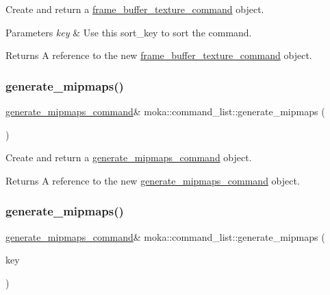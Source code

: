 Create and return a \mbox{\hyperlink{classmoka_1_1frame__buffer__texture__command}{frame\+\_\+buffer\+\_\+texture\+\_\+command}} object. 


\begin{DoxyParams}{Parameters}
{\em key} & Use this sort\+\_\+key to sort the command. \\
\hline
\end{DoxyParams}
\begin{DoxyReturn}{Returns}
A reference to the new \mbox{\hyperlink{classmoka_1_1frame__buffer__texture__command}{frame\+\_\+buffer\+\_\+texture\+\_\+command}} object. 
\end{DoxyReturn}
\mbox{\label{classmoka_1_1command__list_a5248fda12caf3d68ac2803ccfaa3a4f7}} 
\subsubsection{\texorpdfstring{generate\_mipmaps()}{generate\_mipmaps()}\hspace{0.1cm}{\footnotesize\ttfamily [1/2]}}
{\footnotesize\ttfamily \mbox{\hyperlink{classmoka_1_1generate__mipmaps__command}{generate\+\_\+mipmaps\+\_\+command}}\& moka\+::command\+\_\+list\+::generate\+\_\+mipmaps (\begin{DoxyParamCaption}{ }\end{DoxyParamCaption})}



Create and return a \mbox{\hyperlink{classmoka_1_1generate__mipmaps__command}{generate\+\_\+mipmaps\+\_\+command}} object. 

\begin{DoxyReturn}{Returns}
A reference to the new \mbox{\hyperlink{classmoka_1_1generate__mipmaps__command}{generate\+\_\+mipmaps\+\_\+command}} object. 
\end{DoxyReturn}
\mbox{\label{classmoka_1_1command__list_ae7230caa096de9359efba24b439c6558}} 
\subsubsection{\texorpdfstring{generate\_mipmaps()}{generate\_mipmaps()}\hspace{0.1cm}{\footnotesize\ttfamily [2/2]}}
{\footnotesize\ttfamily \mbox{\hyperlink{classmoka_1_1generate__mipmaps__command}{generate\+\_\+mipmaps\+\_\+command}}\& moka\+::command\+\_\+list\+::generate\+\_\+mipmaps (\begin{DoxyParamCaption}\item[{\mbox{\hyperlink{namespacemoka_afa30a616e67b83113ebdb857555cf2bb}{sort\+\_\+key}}}]{key }\end{DoxyParamCaption})}



